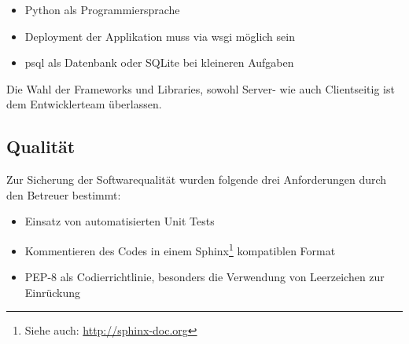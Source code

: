 \begin{itemize}
	\item Python als Programmiersprache %
	\item Deployment der Applikation muss via \gls{wsgi} möglich sein
	\item \gls{psql} als Datenbank oder SQLite bei kleineren Aufgaben
\end{itemize}


Die Wahl der Frameworks und Libraries, sowohl Server- wie auch Clientseitig ist dem Entwicklerteam überlassen.

\subsection{Qualität}
Zur Sicherung der Softwarequalität wurden folgende drei Anforderungen durch den Betreuer bestimmt:

\begin{itemize}
	\item Einsatz von automatisierten Unit Tests
	\item Kommentieren des Codes in einem Sphinx\footnote{Siehe auch: \url{http://sphinx-doc.org}} kompatiblen Format
	\item PEP-8 als Codierrichtlinie, besonders die Verwendung von Leerzeichen zur Einrückung
\end{itemize}


